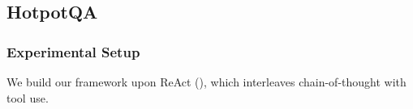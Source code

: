 
\subsection{HotpotQA}
\label{app:hotpotqa}
\vspace{-3pt}
\subsubsection{Experimental Setup}
We build our framework upon ReAct (\cite{yao2023reactsynergizingreasoningacting}), which interleaves chain-of-thought with tool use.

